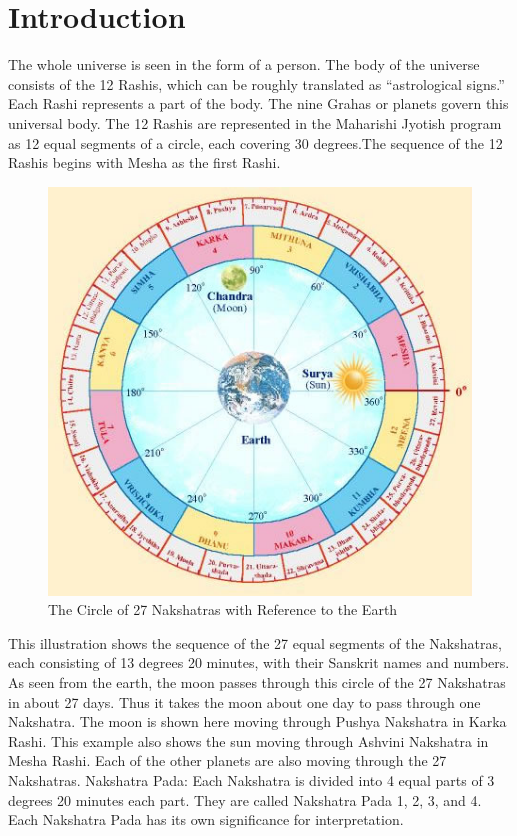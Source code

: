 \documentclass[12pt, right open]{memoir}
\begin{document}
\chapter{Introduction}
The whole universe is seen in the form of a person. The body of the universe consists of the 12 Rashis, which can be roughly translated as “astrological signs.” Each Rashi represents a part of the body. The nine Grahas or planets govern this universal body. The 12 Rashis are represented in the Maharishi Jyotish program as 12 equal segments of a circle, each covering 30 degrees.The sequence of the 12 Rashis begins with Mesha as the first Rashi.

\begin{figure}
\centering
\includegraphics[scale=1]{data/images/jyotish_nakshatras.jpg}
\caption{The Circle of 27 Nakshatras with Reference to the Earth}
\end{figure}

This illustration shows the sequence of the 27 equal segments of the Nakshatras, each consisting of 13 degrees 20 minutes, with their Sanskrit names and numbers. As seen from the earth, the moon passes through this circle of the 27 Nakshatras in about 27 days. Thus it takes the moon about one day to pass through one Nakshatra. The moon is shown here moving through Pushya Nakshatra in Karka Rashi. This example also shows the sun moving through Ashvini Nakshatra in Mesha Rashi. Each of the other planets are also moving through the 27 Nakshatras.
Nakshatra Pada: Each Nakshatra is divided into 4 equal parts of 3 degrees 20 minutes each part. They are called Nakshatra Pada 1, 2, 3, and 4. Each Nakshatra Pada has its own significance for interpretation.
\end{document}
